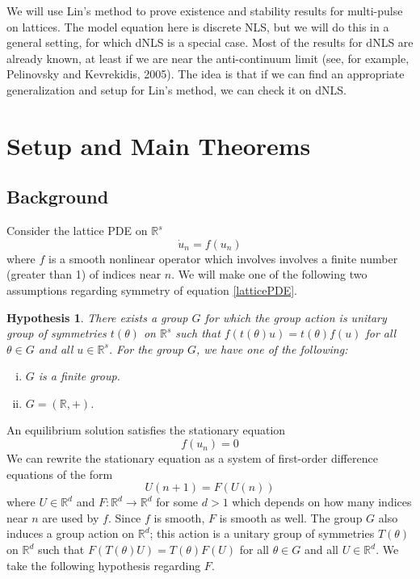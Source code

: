 \documentclass[12pt]{article}
\def\R{{\mathbb R}}
\newtheorem{hypothesis}{Hypothesis}
\begin{document}
We will use Lin's method to prove existence and stability results for multi-pulse on lattices. The model equation here is discrete NLS, but we will do this in a general setting, for which dNLS is a special case. Most of the results for dNLS are already known, at least if we are near the anti-continuum limit (see, for example, Pelinovsky and Kevrekidis, 2005). The idea is that if we can find an appropriate generalization and setup for Lin's method, we can check it on dNLS. 

\section{Setup and Main Theorems}

\subsection{Background}

Consider the lattice PDE on $\R^s$
\begin{equation}\label{latticePDE}
\dot{u}_n = f(u_n)
\end{equation}
where $f$ is a smooth nonlinear operator which involves involves a finite number (greater than 1) of indices near $n$. We will make one of the following two assumptions regarding symmetry of equation \eqref{latticePDE}.

\begin{hypothesis}\label{symmetryhyp}
There exists a group $G$ for which the group action is unitary group of symmetries $t(\theta)$ on $\R^s$ such that $f(t(\theta)u) = t(\theta)f(u)$ for all $\theta \in G$ and all $u \in \R^s$. For the group $G$, we have one of the following:
\begin{enumerate}[(i)]
\item $G$ is a finite group.
\item $G = (\R, +)$.
\end{enumerate}
\end{hypothesis}

An equilibrium solution satisfies the stationary equation 
\begin{equation}\label{stationaryeq}
f(u_n) = 0
\end{equation}
We can rewrite the stationary equation as a system of first-order difference equations of the form
\begin{equation}\label{diffeq}
U(n+1) = F(U(n))
\end{equation}
where $U \in \R^d$ and $F:\R^d \rightarrow \R^d$ for some $d > 1$ which depends on how many indices near $n$ are used by $f$. Since $f$ is smooth, $F$ is smooth as well. The group $G$ also induces  a group action on $\R^d$; this action is a unitary group of symmetries $T(\theta)$ on $\R^d$ such that $F(T(\theta)U) = T(\theta)F(U)$ for all $\theta \in G$ and all $U \in \R^d$. We take the following hypothesis regarding $F$.
\end{document}
